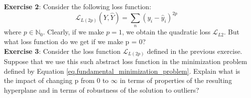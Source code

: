 \textbf{Exercise 2}: Consider the following loss function:
\begin{equation}
\mathcal{L}_{L(2p)}(Y, \hat{Y}) = \sum_n {(y_i - \hat{y}_i)}^{2p}
\end{equation}
where $p \in \mathbb{N}_0$. Clearly, if we make $p=1$, we obtain the quadratic loss $\mathcal{L}_{L2}$. But what loss function do we get if we make p = 0?
\\

\textbf{Exercise 3}: Consider the loss function $\mathcal{L}_{L(2p)}$ defined in the previous exercise. Suppose that we use this such abstract loss function in the minimization problem defined by Equation \ref{eq.fundamental_minimization_problem}. Explain what is the impact of changing p from 0 to $\infty$ in terms of properties of the resulting hyperplane and in terms of robustness of the solution to outliers?

